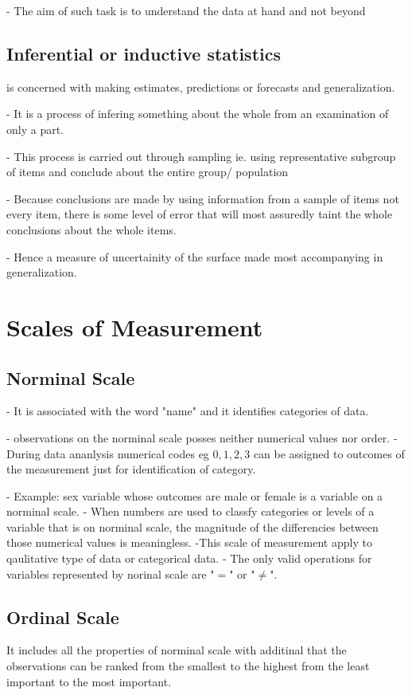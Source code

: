 \documentclass[12pt,a4paper]{article}
\begin{document}
- The aim of such task is to understand the data at hand and not beyond

\subsection{Inferential or inductive statistics}is concerned with making estimates, predictions or forecasts and generalization.

- It is  a process of infering something about the whole from an examination of only a part.

- This process is carried out through sampling ie. using representative subgroup of items and conclude about the entire group/ population

- Because conclusions are made by using information from a sample of items not every item, there is some level of error that will most assuredly taint the whole conclusions about the whole items.

- Hence a measure of uncertainity of the surface made most accompanying in generalization.

\section{Scales of Measurement}

\subsection{Norminal Scale}
- It is associated with the word "name" and it identifies categories of data.

- observations on the norminal scale posses neither numerical values nor order.
- During data ananlysis numerical codes eg $0, 1, 2, 3$ can be assigned to outcomes of the measurement just for identification of category.

- Example: sex variable whose outcomes are male or female is a variable on a norminal scale.
- When numbers are used to classfy categories or levels of a variable that is on norminal scale, the magnitude of the differencies between those numerical values is meaningless.
-This scale of measurement apply to qaulitative type of data or categorical data.
- The only valid operations for variables represented by norinal scale are "$=$" or "$\neq$".
\subsection{Ordinal Scale}
It includes all the properties of norminal scale with additinal that the observations can be ranked from the smallest to the highest from the least important to the most important.
\end{document}
